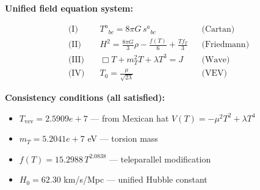 
\textbf{Unified field equation system:}

\begin{align}
  \text{(I)} \quad & T^a{}_{bc} = 8\pi G \, s^a{}_{bc} && \text{(Cartan)} \\
  \text{(II)} \quad & H^2 = \frac{8\pi G}{3}\rho - \frac{f(T)}{6} + \frac{Tf_T}{3} && \text{(Friedmann)} \\
  \text{(III)} \quad & \Box T + m_T^2 T + \lambda T^3 = J && \text{(Wave)} \\
  \text{(IV)} \quad & T_0 = \frac{\mu}{\sqrt{2\lambda}} && \text{(VEV)}
\end{align}

\textbf{Consistency conditions (all satisfied):}
\begin{itemize}
  \item $T_{\text{vev}} = 2.5909e+7$ — from Mexican hat $V(T) = -\mu^2 T^2 + \lambda T^4$
  \item $m_T = 5.2041e+7$ eV — torsion mass
  \item $f(T) = 15.2988 \, T^{2.0838}$ — teleparallel modification
  \item $H_0 = 62.30$ km/s/Mpc — unified Hubble constant
\end{itemize}